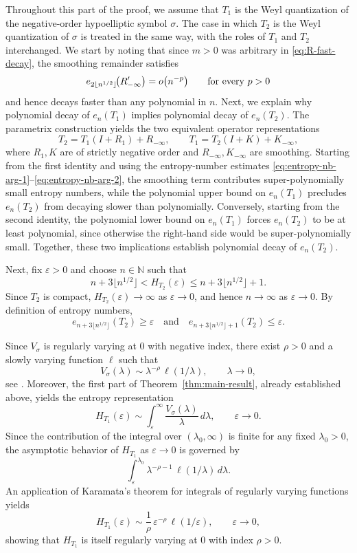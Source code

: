 \documentclass[a4paper,12pt]{article}
\let\originalleft\left
\let\originalright\right
\renewcommand{\left}{\mathopen{}\mathclose\bgroup\originalleft}
\renewcommand{\right}{\aftergroup\egroup\originalright}
\newcommand{\N}{\mathbb{N}}
\begin{document}
Throughout this part of the proof, we assume that $T_1$ is the Weyl
quantization of the negative-order hypoelliptic symbol $\sigma$. The case in which $T_2$ is the Weyl quantization of $\sigma$ is treated in the same way,
with the roles of $T_1$ and $T_2$ interchanged. We start by noting that 
since $m>0$ was arbitrary in \eqref{eq:R-fast-decay}, the smoothing remainder
satisfies
\[
e_{2\lfloor n^{1/2}\rfloor}\!\left(R'_{-\infty}\right)
=o \left(n^{-p}\right)
\qquad\text{for every }p>0
\]
and hence decays faster than any polynomial in $n$.
Next, we explain why polynomial decay of $e_n(T_1)$ implies polynomial decay of
$e_n(T_2)$.
The parametrix construction yields the two equivalent operator representations
\begin{equation}\label{eq:parametrix-two}
T_2 = T_1(I+R_1)+R_{-\infty},
\qquad
T_1 = T_2(I+K)+K_{-\infty},
\end{equation}
where $R_1,K$ are of strictly negative order and $R_{-\infty},K_{-\infty}$ are smoothing.
Starting from the first identity and using the entropy-number estimates
\eqref{eq:entropy-nb-arg-1}--\eqref{eq:entropy-nb-arg-2}, the smoothing term contributes
super-polynomially small entropy numbers, while the polynomial upper bound on $e_n(T_1)$
precludes $e_n(T_2)$ from decaying slower than polynomially.
Conversely, starting from the second identity, the polynomial lower bound on $e_n(T_1)$
forces $e_n(T_2)$ to be at least polynomial, since otherwise the right-hand side would be
super-polynomially small.
Together, these two implications establish polynomial decay of $e_n(T_2)$.

Next, fix $\varepsilon>0$ and choose $n\in\N$ such that
\[
n+3\lfloor n^{1/2}\rfloor
< H_{T_2}(\varepsilon)
\le n+3\lfloor n^{1/2}\rfloor+1.
\]
Since $T_2$ is compact, $H_{T_2}(\varepsilon)\to\infty$ as $\varepsilon\to0$, and hence
$n\to\infty$ as $\varepsilon\to0$.
By definition of entropy numbers,
\[
e_{n+3\lfloor n^{1/2}\rfloor}(T_2)\ge \varepsilon
\quad\text{and}\quad
e_{n+3\lfloor n^{1/2}\rfloor+1}(T_2)\le \varepsilon.
\]

Since $V_\sigma$ is regularly varying at $0$ with negative index, there exist
$\rho>0$ and a slowly varying function $\ell$ such that
\[
V_\sigma(\lambda)\sim \lambda^{-\rho}\,\ell(1/\lambda),
\qquad \lambda\to0,
\]
see \cite{binghamRegularVariation1987}.
Moreover, the first part of Theorem~\ref{thm:main-result}, already established above,
yields the entropy representation
\[
H_{T_1}(\varepsilon)\sim \int_\varepsilon^\infty \frac{V_\sigma(\lambda)}{\lambda}\,d\lambda,
\qquad \varepsilon \to 0.
\]
Since the contribution of the integral over $(\lambda_0,\infty)$ is finite for any fixed
$\lambda_0>0$, the asymptotic behavior of $H_{T_1}$ as $\varepsilon \to 0$ is governed
by
\[
\int_\varepsilon^{\lambda_0} \lambda^{-\rho-1}\,\ell(1/\lambda)\,d\lambda.
\]
An application of Karamata’s theorem for integrals of regularly varying functions
yields
\begin{equation}\label{eq:HT1-varying}
H_{T_1}(\varepsilon)\sim \frac{1}{\rho}\,\varepsilon^{-\rho}\,\ell(1/\varepsilon),
\qquad \varepsilon \to 0,
\end{equation}
showing that $H_{T_1}$ is itself regularly varying at $0$ with index $\rho>0$.
\end{document}

